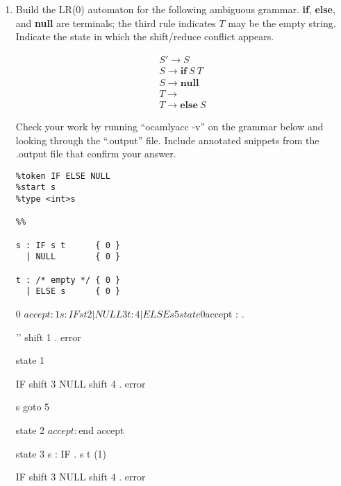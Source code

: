 \documentclass[twocolumn,letterpaper]{article}
\begin{document}
\begin{enumerate}
\item Build the LR(0) automaton for the following ambiguous grammar.
  \textbf{if}, \textbf{else}, and \textbf{null} are terminals; the
  third rule indicates $T$ may be the empty string.  Indicate the state
  in which the shift/reduce conflict appears.

\[
\begin{array}{l}
S' \rightarrow S \\
S \rightarrow \textbf{if}\ S\ T \\
S \rightarrow \textbf{null} \\
T \rightarrow \\
T \rightarrow \textbf{else}\ S
\end{array}
\]

Check your work by running ``ocamlyacc -v'' on the grammar below and
looking through the ``.output'' file.  Include annotated snippets from
the .output file that confirm your answer.

\begin{verbatim}
%token IF ELSE NULL
%start s
%type <int>s

%%

s : IF s t      { 0 }
  | NULL        { 0 }

t : /* empty */ { 0 }
  | ELSE s      { 0 }
\end{verbatim}

%
%
%

   0  $accept : %

   1  s : IF s t
   2    | NULL

   3  t :
   4    | ELSE s

   5  %

state 0
	$accept : . %

	''  shift 1
	.  error



state 1

	IF  shift 3
	NULL  shift 4
	.  error

	s  goto 5


state 2
	$accept : %

	$end  accept


state 3
	s : IF . s t  (1)

	IF  shift 3
	NULL  shift 4
	.  error


\end{enumerate}
\end{document}

